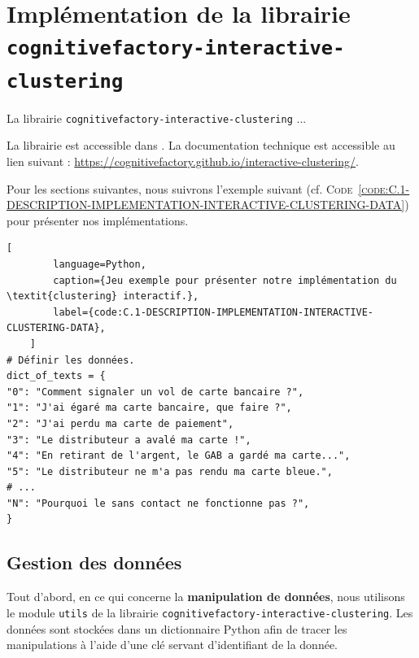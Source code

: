 \section{Implémentation de la librairie \texttt{cognitivefactory-interactive-clustering}}
\label{section:C.1-DESCRIPTION-IMPLEMENTATION-INTERACTIVE-CLUSTERING}
	
	La librairie \texttt{cognitivefactory-interactive-clustering} ...
	
	\begin{leftBarInformation}
		La librairie est accessible dans \cite{schild:2022:cognitivefactory-interactiveclustering}.
		La documentation technique est accessible au lien suivant : \url{https://cognitivefactory.github.io/interactive-clustering/}.
	\end{leftBarInformation}
	
	Pour les sections suivantes, nous suivrons l'exemple suivant (cf. \textsc{Code~\ref{code:C.1-DESCRIPTION-IMPLEMENTATION-INTERACTIVE-CLUSTERING-DATA}}) pour présenter nos implémentations.
	
	\begin{lstlisting}[
		language=Python,
		caption={Jeu exemple pour présenter notre implémentation du \textit{clustering} interactif.},
		label={code:C.1-DESCRIPTION-IMPLEMENTATION-INTERACTIVE-CLUSTERING-DATA},
	]
# Définir les données.
dict_of_texts = {
"0": "Comment signaler un vol de carte bancaire ?",
"1": "J'ai égaré ma carte bancaire, que faire ?",
"2": "J'ai perdu ma carte de paiement",
"3": "Le distributeur a avalé ma carte !",
"4": "En retirant de l'argent, le GAB a gardé ma carte...",
"5": "Le distributeur ne m'a pas rendu ma carte bleue.",
# ...
"N": "Pourquoi le sans contact ne fonctionne pas ?",
}
	\end{lstlisting}
	
	
	\subsection{Gestion des données}
	\label{section:C.1.1-DESCRIPTION-IMPLEMENTATION-INTERACTIVE-CLUSTERING-GESTION-DES-DONNEES}
	
	Tout d'abord, en ce qui concerne la \textbf{manipulation de données}, nous utilisons le module \texttt{utils} de la librairie \texttt{cognitivefactory-interactive-clustering}.
	Les données sont stockées dans un dictionnaire Python afin de tracer les manipulations à l'aide d'une clé servant d'identifiant de la donnée.
	
